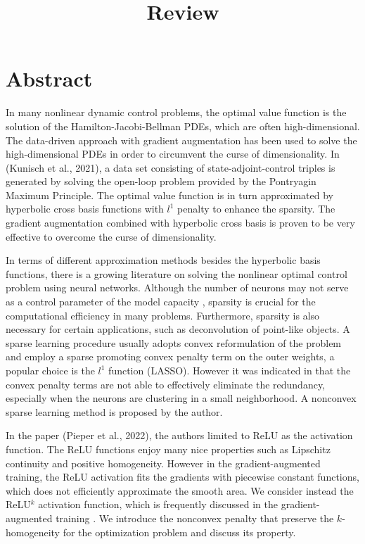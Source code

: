 \documentclass[12pt,fleqn]{amsart}
\title[Review]{Review}
\theoremstyle{definition}
\begin{document}
\section{Abstract}
In many nonlinear dynamic control problems, the optimal value function is the solution of 
the Hamilton-Jacobi-Bellman PDEs, which are often high-dimensional. 
The data-driven approach with gradient augmentation has been used to solve the high-dimensional PDEs in order to circumvent the curse of dimensionality. 
In \cite{azmi2021optimal} (Kunisch et al., 2021), a data set consisting of state-adjoint-control triples is generated by solving the open-loop problem provided by the Pontryagin Maximum Principle. 
The optimal value function is in turn approximated by hyperbolic cross basis functions with $l^1$ penalty to enhance the sparsity.
The gradient augmentation combined with hyperbolic cross basis is proven to be very effective to overcome the curse of dimensionality. \par 
 
In terms of different approximation methods besides the hyperbolic basis functions, there is a growing literature on solving the nonlinear optimal control problem using neural networks. 
Although the number of neurons may not serve as a control parameter of the model capacity \cite{neyshabur2014search}, sparsity is crucial for the computational efficiency in many problems. 
Furthermore, sparsity is also necessary for certain applications, such as deconvolution of point-like objects. 
 A sparse learning procedure usually adopts convex reformulation of the problem and employ a sparse promoting convex penalty term on the outer weights, a popular choice is the $l^1$ function (LASSO). 
 However it was indicated in \cite{pieper2022nonconvex} that the convex penalty terms are not able to effectively eliminate the redundancy, especially when the neurons are clustering in a small neighborhood. 
 A nonconvex sparse learning method is proposed by the author. \par
In the paper \cite{pieper2022nonconvex}(Pieper et al., 2022), the authors limited to ReLU as the activation function. 
The ReLU functions enjoy many nice properties such as Lipschitz continuity and positive homogeneity.
However in the gradient-augmented training, the ReLU activation fits the gradients with piecewise constant functions, which does not efficiently approximate the smooth area. 
We consider instead the ReLU$^k$ activation function, which is frequently discussed in the gradient-augmented training \cite{li2024twolayer}. 
We introduce the nonconvex penalty that preserve the $k$-homogeneity for the optimization problem and discuss its property.  \par
\end{document}
